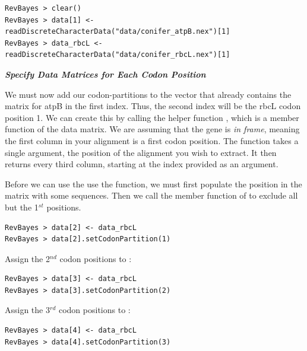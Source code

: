 {\tt \begin{snugshade*}
\begin{lstlisting}
RevBayes > clear()
RevBayes > data[1] <- readDiscreteCharacterData("data/conifer_atpB.nex")[1]
RevBayes > data_rbcL <- readDiscreteCharacterData("data/conifer_rbcL.nex")[1]
\end{lstlisting}
\end{snugshade*}}

\textbf{\textit{Specify Data Matrices for Each Codon Position}}

We must now add our codon-partitions to the  vector that already contains the matrix for atpB in the first index. 
Thus, the second index will be the rbcL codon position 1. 
We can create this by calling the helper function , which is a member function of the data matrix. 
We are assuming that the gene is \textit{in frame}, meaning the first column in your alignment is a first codon position. 
The  function takes a single argument, the position of the alignment you wish to extract. 
It then returns every third column, starting at the index provided as an argument.

Before we can use the use the  function, we must first populate the position in the  matrix with some sequences. 
Then we call the member function of  to exclude all but the 1$^{st}$ positions.
{\tt \begin{snugshade*}
\begin{lstlisting}
RevBayes > data[2] <- data_rbcL
RevBayes > data[2].setCodonPartition(1)
\end{lstlisting}
\end{snugshade*}}

Assign the 2$^{nd}$ codon positions to :
{\tt \begin{snugshade*}
\begin{lstlisting}
RevBayes > data[3] <- data_rbcL
RevBayes > data[3].setCodonPartition(2)
\end{lstlisting}
\end{snugshade*}}

Assign the 3$^{rd}$ codon positions to :
{\tt \begin{snugshade*}
\begin{lstlisting}
RevBayes > data[4] <- data_rbcL
RevBayes > data[4].setCodonPartition(3)
\end{lstlisting}
\end{snugshade*}}



